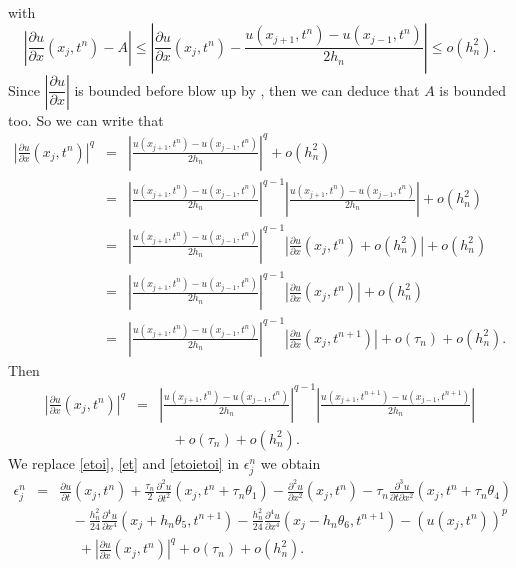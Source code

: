 \documentclass[a4paper,12pt,english,reqno]{smfart}
\begin{document}
	with 
	\begin{equation*}
	\left|\frac{\partial u}{\partial x}(x_{j},t^{n})-A\right|\leq \left|\frac{\partial u}{\partial x}(x_{j},t^{n})-\frac{u(x_{j+1},t^{n})-u(x_{j-1},t^{n})}{2h_{n}}\right| \leq o(h_{n}^{2}).
	\end{equation*}
	Since $\left|\dfrac{\partial u}{\partial x}\right|$ is bounded before blow up by \cite{chipotweissler}, then we can deduce that $A$ is bounded too. So we can write that
	\begin{eqnarray}
	\left|\frac{\partial u}{\partial x}(x_{j},t^{n})\right|^{q}&=&\left|\frac{u(x_{j+1},t^{n})-u(x_{j-1},t^{n})}{2h_{n}}\right|^{q}+o(h_{n}^{2})\label{starstar}\\
	\nonumber  &=&\left|\frac{u(x_{j+1},t^{n})-u(x_{j-1},t^{n})}{2h_{n}}\right|^{q-1}\left|\frac{u(x_{j+1},t^{n})-u(x_{j-1},t^{n})}{2h_{n}}\right|+o(h_{n}^{2})\\
	\nonumber &=&\left|\frac{u(x_{j+1},t^{n})-u(x_{j-1},t^{n})}{2h_{n}}\right|^{q-1}\left|\frac{\partial u}{\partial x}(x_{j},t^{n})+o(h_{n}^{2})\right|+o(h_{n}^{2})\\
	\nonumber &=&\left|\frac{u(x_{j+1},t^{n})-u(x_{j-1},t^{n})}{2h_{n}}\right|^{q-1}\left|\frac{\partial u}{\partial x}(x_{j},t^{n})\right|+o(h_{n}^{2})\\
	\nonumber &=&\left|\frac{u(x_{j+1},t^{n})-u(x_{j-1},t^{n})}{2h_{n}}\right|^{q-1}\left|\frac{\partial u}{\partial x}(x_{j},t^{n+1})\right|+o(\tau_{n})+o(h_{n}^{2}).
	\end{eqnarray}
	Then
	\begin{eqnarray}
	\left|\frac{\partial u}{\partial x}(x_{j},t^{n})\right|^{q}&=&\left|\frac{u(x_{j+1},t^{n})-u(x_{j-1},t^{n})}{2h_{n}}\right|^{q-1}\left|\frac{u(x_{j+1},t^{n+1})-u(x_{j-1},t^{n+1})}{2h_{n}}\right| \nonumber \\
	&&\ \ \ \ +o(\tau_{n})+o(h_{n}^{2}).
	\label{etoietoi}
	\end{eqnarray}
	We replace \eqref{etoi}, \eqref{et} and \eqref{etoietoi} in $\epsilon_{j}^{n}$ we obtain
	\begin{eqnarray*}
		\epsilon_{j}^{n}&=&\frac{\partial u}{\partial t}(x_{j},t^{n})+\frac{\tau_{n}}{2}\frac{\partial^{2} u}{\partial t^{2}}(x_{j},t^{n}+\tau_{n}\theta_{1})-
		\frac{\partial^{2} u}{\partial x^{2}}(x_{j},t^{n})-\tau_{n}\frac{\partial^{3} u}{\partial t \partial x^{2}}(x_{j},t^{n}+\tau_{n}\theta_{4})\\
		&&\ \ \ \ -\frac{h_{n}^{2}}{24}\frac{\partial^{4} u}{\partial x^{4}}(x_{j}+h_{n}\theta_{5},t^{n+1})-\frac{h_{n}^{2}}{24}\frac{\partial^{4} u}{\partial x^{4}}(x_{j}-h_{n}\theta_{6},t^{n+1})-\left(u(x_{j},t^{n})\right)^{p}\\
		&&\ \ \ \ \ \ +\left|\frac{\partial u}{\partial x}(x_{j},t^{n})\right|^{q}+o(\tau_{n})+o(h_{n}^{2}).
	\end{eqnarray*}
\end{document}
